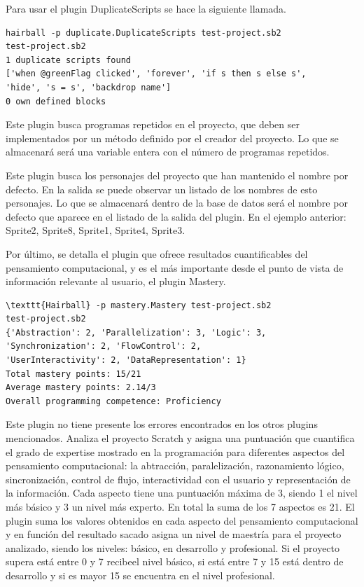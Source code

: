 \documentclass[a4paper, 12pt]{book}
\begin{document}
Para usar el plugin DuplicateScripts se hace la siguiente llamada.
\begingroup
\fontsize{7pt}{8pt}\selectfont
\begin{verbatim}
hairball -p duplicate.DuplicateScripts test-project.sb2 
test-project.sb2
1 duplicate scripts found
['when @greenFlag clicked', 'forever', 'if s then s else s',
'hide', 's = s', 'backdrop name']
0 own defined blocks
\end{verbatim}
\endgroup

Este plugin busca programas repetidos en el proyecto, que deben ser implementados por un
método definido por el creador del proyecto. Lo que se almacenará será una variable entera
con el número de programas repetidos.

Este plugin busca los personajes del proyecto que han mantenido el nombre por defecto. En
la salida se puede observar un listado de los nombres de esto personajes. Lo que se 
almacenará dentro de la base de datos será el nombre por defecto que aparece en el listado
de la salida del plugin. En el ejemplo anterior: Sprite2, Sprite8, Sprite1, Sprite4, Sprite3.


Por último, se detalla el plugin que ofrece resultados cuantificables del pensamiento 
computacional, y es el más importante desde el punto de vista de información relevante
al usuario, el plugin Mastery.

\begingroup
\fontsize{7pt}{8pt}\selectfont
\begin{verbatim}
\texttt{Hairball} -p mastery.Mastery test-project.sb2 
test-project.sb2
{'Abstraction': 2, 'Parallelization': 3, 'Logic': 3, 'Synchronization': 2, 'FlowControl': 2,
'UserInteractivity': 2, 'DataRepresentation': 1}
Total mastery points: 15/21
Average mastery points: 2.14/3
Overall programming competence: Proficiency
\end{verbatim}
\endgroup

Este plugin no tiene presente los errores encontrados en los otros plugins mencionados.
Analiza el proyecto Scratch y asigna una puntuación que cuantifica el grado de expertise
mostrado en la programación para diferentes aspectos del pensamiento computacional: la
abtracción, paralelización, razonamiento lógico, sincronización, control de flujo,
interactividad con el usuario y representación de la información. Cada aspecto tiene
una puntuación máxima de 3, siendo 1 el nivel más básico y 3 un nivel más experto. En
total la suma de los 7 aspectos es 21. El plugin suma los valores obtenidos en cada 
aspecto del pensamiento computacional y en función del resultado sacado asigna un
nivel de maestría para el proyecto analizado, siendo los niveles: básico, en desarrollo
y profesional. Si el proyecto supera está entre 0 y 7 recibeel nivel básico, si está 
entre 7 y 15 está dentro de desarrollo y si es mayor 15 se encuentra en el nivel
profesional.
\end{document}
